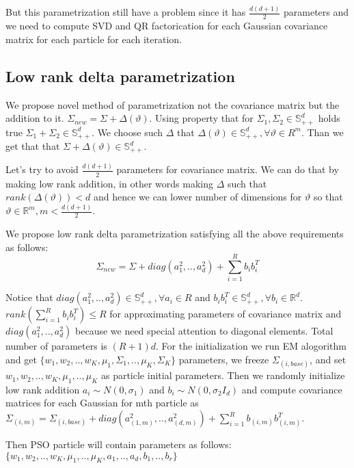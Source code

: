 \documentclass[a4paper]{article}
\begin{document}
But this parametrization still have a problem since it has $\frac{d(d+1)}{2}$ parameters and we need to compute SVD 
and QR factorication for each Gaussian covariance matrix for each particle for each iteration.

\subsection{Low rank delta parametrization}

We propose novel method of parametrization not the covariance matrix but the addition to it. $\Sigma_{new}  = \Sigma + \Delta(\vartheta)$. 
Using property that for $\Sigma_1, \Sigma_2 \in \mathbb{S}^d_{++}$ holds true $\Sigma_1 + \Sigma_2 \in \mathbb{S}^d_{++}$.
We choose such $\Delta$ that $\Delta(\vartheta) \in \mathbb{S}^d_{++}, \forall \vartheta \in R^m$. 
Than we get that that $\Sigma + \Delta(\vartheta) \in \mathbb{S}^d_{++}$.

Let's try to avoid $\frac{d(d+1)}{2}$ parameters for covariance matrix. We can do that by making low rank addition,
 in other words making $\Delta$ such that $rank(\Delta(\vartheta)) < d$ and 
 hence we can lower number of dimensions for $\vartheta$ so that $\vartheta \in \mathbb{R}^{m}, m < \frac{d(d+1)}{2}$.

 We propose low rank delta parametrization satisfying all the above requirements as follows:
 $$\Sigma_{new}  = \Sigma + diag(a_1^2, .., a_d^2) + \sum_{i=1}^{R}b_ib_i^T$$

 Notice that $diag(a_1^2, .., a_d^2) \in \mathbb{S}^d_{++}, \forall a_i \in R$ and $b_ib_i^T \in \mathbb{S}^d_{++}, \forall b_i \in \mathbb{R}^{d}$. 
 $rank(\sum_{i=1}^{R} b_ib_i^T) \leq R$ for approximating parameters of covariance matrix and 
 $diag(a_1^2, .., a_d^2)$ because we need special attention to diagonal elements. 
 Total number of parameters is $(R + 1)d$. For the initialization we run EM alogorithm and get 
 $\{w_1, w_2, .., w_K, \mu_1, \Sigma_1, .., \mu_K, \Sigma_K\}$ parameters, we freeze $\Sigma_{(i, base)}$, 
 and set ${w_1, w_2, .., w_K, \mu_1, .., \mu_K}$ as particle initial parameters. 
 Then we randomly initialize low rank addition $a_i \sim N(0, \sigma_1)$ and $b_i \sim N(0, \sigma_2 I_d)$ and 
 compute covariance matrices for each Gaussian for mth particle as 
 $\Sigma_{(i, m)} = \Sigma_{(i, base)} + diag(a_{(1, m)}^2, .., a_{(d, m)}^2) + \sum_{i=1}^{R}b_{(i, m)}b_{(i, m)}^T$. 

Then PSO particle will contain parameters as follows: $\{ w_1, w_2, .., w_K, \mu_1, .., \mu_K, a_1, .., a_d, b_1, .., b_r\}$
\end{document}
